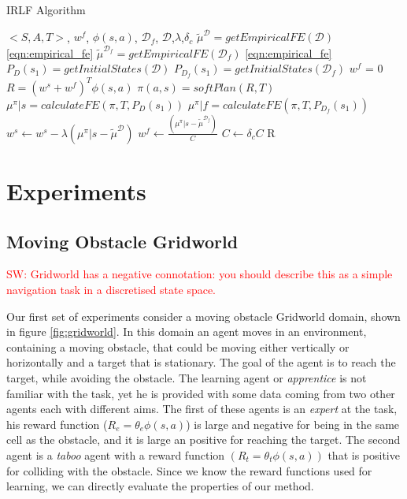 \documentclass[letterpaper]{article}
\newcommand{\sw}[1]{\textcolor{red}{SW: #1}}
\newcommand{\sw}[1]{}
\begin{document}
\begin{algorithm}[h]
\caption{IRLF Algorithm}
\label{alg:lff}
\begin{algorithmic}[1]
\REQUIRE $<S,A,T>$, $w^f$, $\phi(s,a)$, $\mathcal{D}_f$, $\mathcal{D}$,$\lambda$,$\delta_c$
\STATE $\widetilde{\mu}^{\mathcal{D}} = getEmpiricalFE(\mathcal{D})$  \eqref{eqn:empirical_fe}
\STATE $\widetilde{\mu}^{\mathcal{D}_f} = getEmpiricalFE(\mathcal{D}_f)$ \eqref{eqn:empirical_fe}
\STATE $P_{D}(s_1) = getInitialStates(\mathcal{D})$
\STATE $P_{D_f}(s_1) = getInitialStates(\mathcal{D}_f)$
\STATE $w^f$ = 0
\STATE $R = (w^s+w^f)^T\phi(s,a)$
\STATE $\pi(a,s) = softPlan(R,T)$
\STATE $\mu^\pi|s = calculateFE(\pi,T,P_{D}(s_1))$
\STATE $\mu^\pi|f = calculateFE(\pi,T,P_{D_f}(s_1))$
\STATE $w^s \leftarrow w^s - \lambda (\mu^\pi|s - \widetilde{\mu}^{\mathcal{D}})$
\STATE $w^f \leftarrow \frac{(\mu^\pi|s - \widetilde{\mu}^{\mathcal{D}_f})}{C}$
\STATE $C \leftarrow \delta_cC$
\ENDIF
\ENDWHILE
\RETURN R
\end{algorithmic}
\end{algorithm}

\section{Experiments}
\subsection{Moving Obstacle Gridworld}

\sw{Gridworld has a negative connotation: you should describe this as a simple navigation task in a discretised state space.}

Our first set of experiments consider a moving obstacle Gridworld domain, shown in figure \ref{fig:gridworld}.
In this domain an agent moves in an environment, containing a moving obstacle, that could be moving either vertically
or horizontally and a target that is stationary. The goal of the agent is to reach the target, while avoiding 
the obstacle. The learning agent or \emph{apprentice} is not familiar with the task, yet he is provided with some data coming from two other agents
each with different aims. The first of these agents is an \emph{expert} at the task, his reward function ($R_e = \theta_e\phi(s,a)$) is large and negative
for being in the same cell as the obstacle, and it is large an positive for reaching the target. The second agent is a
\emph{taboo} agent with a reward function $(R_t=\theta_t\phi(s,a))$ that is positive for colliding with the obstacle. Since we know the reward functions used for learning, we can directly evaluate the properties of our method. 
\end{document}
